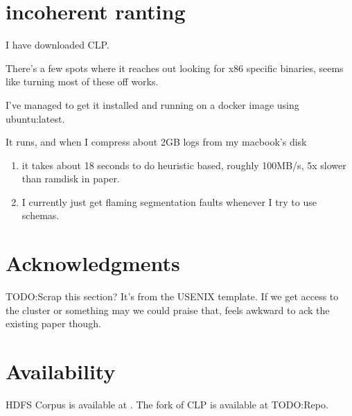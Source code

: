 \documentclass[letterpaper,twocolumn,10pt]{article}
\begin{document}


\section{incoherent ranting}

I have downloaded CLP.

There's a few spots where it reaches out looking for x86 specific binaries, seems like turning most of these off works.

I've managed to get it installed and running on a docker image using ubuntu:latest.

It runs, and when I compress about 2GB logs from my macbook's disk
\begin{enumerate}
  \item it takes about 18 seconds to do heuristic based, roughly 100MB/s, 5x slower than ramdisk in paper.
  \item I currently just get flaming segmentation faults whenever I try to use schemas.
\end{enumerate}

\section*{Acknowledgments}
TODO:Scrap this section? It's from the USENIX template. If we get access to the cluster or something may we could praise that, feels awkward to ack the existing paper though.

\section*{Availability}

HDFS Corpus is available at \cite{hadoop14tbdataset}. The fork of CLP is available at TODO:Repo.




\end{document}
